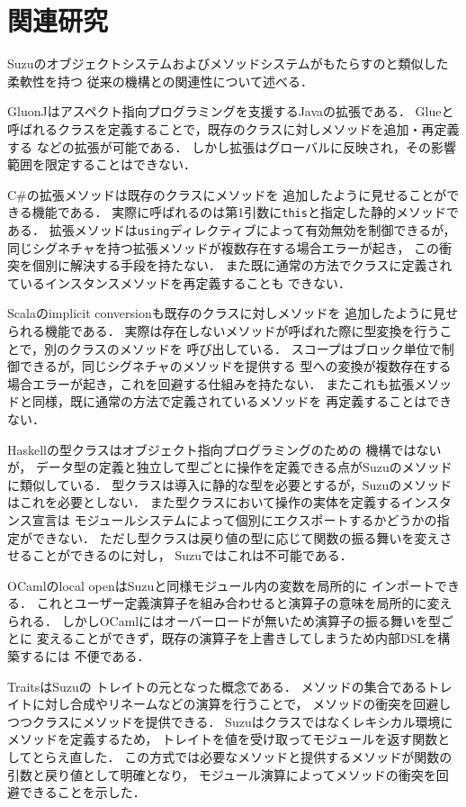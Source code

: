 \documentclass[a4paper,11pt,dvipdfmx]{jreport}
\begin{document}
\chapter{関連研究}
\label{chapter:related-work}

Suzuのオブジェクトシステムおよびメソッドシステムがもたらすのと類似した柔軟性を持つ
従来の機構との関連性について述べる．

GluonJ\cite{GluonJ}はアスペクト指向プログラミングを支援するJavaの拡張である．
Glueと呼ばれるクラスを定義することで，既存のクラスに対しメソッドを追加・再定義する
などの拡張が可能である．
しかし拡張はグローバルに反映され，その影響範囲を限定することはできない．

C\#の拡張メソッド\cite{ExtentionMethods}は既存のクラスにメソッドを
追加したように見せることができる機能である．
実際に呼ばれるのは第1引数に\verb|this|と指定した静的メソッドである．
拡張メソッドは\verb|using|ディレクティブによって有効無効を制御できるが，
同じシグネチャを持つ拡張メソッドが複数存在する場合エラーが起き，
この衝突を個別に解決する手段を持たない．
また既に通常の方法でクラスに定義されているインスタンスメソッドを再定義することも
できない．

Scala\cite{Scala}のimplicit conversionも既存のクラスに対しメソッドを
追加したように見せられる機能である．
実際は存在しないメソッドが呼ばれた際に型変換を行うことで，別のクラスのメソッドを
呼び出している．
スコープはブロック単位で制御できるが，同じシグネチャのメソッドを提供する
型への変換が複数存在する場合エラーが起き，これを回避する仕組みを持たない．
またこれも拡張メソッドと同様，既に通常の方法で定義されているメソッドを
再定義することはできない．

Haskellの型クラス\cite{TypeClasses}はオブジェクト指向プログラミングのための
機構ではないが，
データ型の定義と独立して型ごとに操作を定義できる点がSuzuのメソッドに類似している．
型クラスは導入に静的な型を必要とするが，Suzuのメソッドはこれを必要としない．
また型クラスにおいて操作の実体を定義するインスタンス宣言は
モジュールシステムによって個別にエクスポートするかどうかの指定ができない．
ただし型クラスは戻り値の型に応じて関数の振る舞いを変えさせることができるのに対し，
Suzuではこれは不可能である．

OCaml\cite{OCaml}のlocal openはSuzuと同様モジュール内の変数を局所的に
インポートできる．
これとユーザー定義演算子を組み合わせると演算子の意味を局所的に変えられる．
しかしOCamlにはオーバーロードが無いため演算子の振る舞いを型ごとに
変えることができず，既存の演算子を上書きしてしまうため内部DSLを構築するには
不便である．

Traits\cite{Traits,ApplyingTraits,FineGrainedReuse}はSuzuの
トレイトの元となった概念である．
メソッドの集合であるトレイトに対し合成やリネームなどの演算を行うことで，
メソッドの衝突を回避しつつクラスにメソッドを提供できる．
Suzuはクラスではなくレキシカル環境にメソッドを定義するため，
トレイトを値を受け取ってモジュールを返す関数としてとらえ直した．
この方式では必要なメソッドと提供するメソッドが関数の引数と戻り値として明確となり，
モジュール演算によってメソッドの衝突を回避できることを示した．
\end{document}
